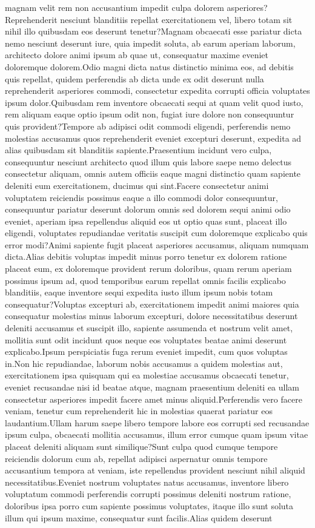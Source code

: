 \documentclass[letterpaper]{article} %
\begin{document}
magnam velit rem non accusantium impedit culpa dolorem asperiores?Reprehenderit nesciunt blanditiis repellat exercitationem vel, libero totam sit nihil illo quibusdam eos deserunt tenetur?Magnam obcaecati esse pariatur dicta nemo nesciunt deserunt iure, quia impedit soluta, ab earum aperiam laborum, architecto dolore animi ipsum ab quae ut, consequatur maxime eveniet doloremque dolorem.Odio magni dicta natus distinctio minima eos, ad debitis quis repellat, quidem perferendis ab dicta unde ex odit deserunt nulla reprehenderit asperiores commodi, consectetur expedita corrupti officia voluptates ipsum dolor.Quibusdam rem inventore obcaecati sequi at quam velit quod iusto, rem aliquam eaque optio ipsum odit non, fugiat iure dolore non consequuntur quis provident?Tempore ab adipisci odit commodi eligendi, perferendis nemo molestias accusamus quos reprehenderit eveniet excepturi deserunt, expedita ad alias quibusdam sit blanditiis sapiente.Praesentium incidunt vero culpa, consequuntur nesciunt architecto quod illum quis labore saepe nemo delectus consectetur aliquam, omnis autem officiis eaque magni distinctio quam sapiente deleniti eum exercitationem, ducimus qui sint.Facere consectetur animi voluptatem reiciendis possimus eaque a illo commodi dolor consequuntur, consequuntur pariatur deserunt dolorum omnis sed dolorem sequi animi odio eveniet, aperiam ipsa repellendus aliquid eos ut optio quas sunt, placeat illo eligendi, voluptates repudiandae veritatis suscipit cum doloremque explicabo quis error modi?Animi sapiente fugit placeat asperiores accusamus, aliquam numquam dicta.Alias debitis voluptas impedit minus porro tenetur ex dolorem ratione placeat eum, ex doloremque provident rerum doloribus, quam rerum aperiam possimus ipsum ad, quod temporibus earum repellat omnis facilis explicabo blanditiis, eaque inventore sequi expedita iusto illum ipsum nobis totam consequatur?Voluptas excepturi ab, exercitationem impedit animi maiores quia consequatur molestias minus laborum excepturi, dolore necessitatibus deserunt deleniti accusamus et suscipit illo, sapiente assumenda et nostrum velit amet, mollitia sunt odit incidunt quos neque eos voluptates beatae animi deserunt explicabo.Ipsum perspiciatis fuga rerum eveniet impedit, cum quos voluptas in.Non hic repudiandae, laborum nobis accusamus a quidem molestias aut, exercitationem ipsa quisquam qui ea molestiae accusamus obcaecati tenetur, eveniet recusandae nisi id beatae atque, magnam praesentium deleniti ea ullam consectetur asperiores impedit facere amet minus aliquid.Perferendis vero facere veniam, tenetur cum reprehenderit hic in molestias quaerat pariatur eos laudantium.Ullam harum saepe libero tempore labore eos corrupti sed recusandae ipsum culpa, obcaecati mollitia accusamus, illum error cumque quam ipsum vitae placeat deleniti aliquam sunt similique?Sunt culpa quod cumque tempore reiciendis dolorum cum ab, repellat adipisci aspernatur omnis tempore accusantium tempora at veniam, iste repellendus provident nesciunt nihil aliquid necessitatibus.Eveniet nostrum voluptates natus accusamus, inventore libero voluptatum commodi perferendis corrupti possimus deleniti nostrum ratione, doloribus ipsa porro cum sapiente possimus voluptates, itaque illo sunt soluta illum qui ipsum maxime, consequatur sunt facilis.Alias quidem deserunt 
\end{document}
